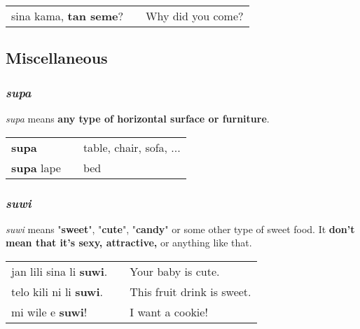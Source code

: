 \begin{supertabular}{p{5,5cm}|ll}
sina kama, \textbf{tan seme}? && Why did you come? \\
\end{supertabular} 

%
\subsection*{Miscellaneous}
%
\subsubsection*{\textit{supa}}
%
\textit{supa} means \textbf{any type of horizontal surface or furniture}. 

\begin{supertabular}{p{5,5cm}|ll}
\textbf{supa}  && table, chair, sofa, ...  \\
\textbf{supa} lape &&  bed \\
\end{supertabular} 
%
\subsubsection*{\textit{suwi}}
%
\textit{suwi} means "\textbf{sweet}", "\textbf{cute}", "\textbf{candy}" or some other type of sweet food. 
It \textbf{don't mean that it's sexy, attractive,} or anything like that. 

\begin{supertabular}{p{5,5cm}|ll}
jan lili sina li \textbf{suwi}. && Your baby is cute. \\
telo kili ni li \textbf{suwi}. && This fruit drink is sweet. \\
mi wile e \textbf{suwi}! && I want a cookie! \\
\end{supertabular} 
%
